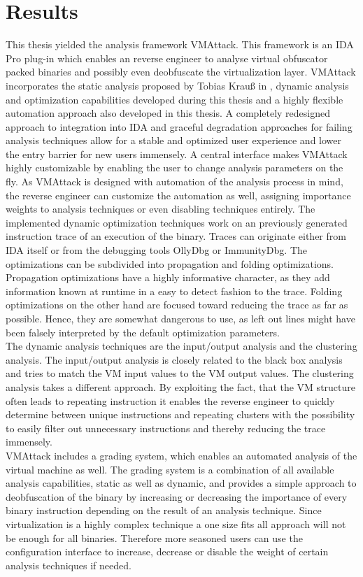 \documentclass[10pt,twoside,a4paper,bibliography=totoc]{scrbook}
\newcommand{\echoOther}[1]{Tobias Krau{\ss}}
\begin{document}
\section{Results}
\label{sec1:result}
This thesis yielded the analysis framework VMAttack. This framework is an IDA Pro plug-in which enables an reverse engineer to analyse virtual obfuscator packed binaries and possibly even deobfuscate the virtualization layer. 
VMAttack incorporates the static analysis proposed by \echoOther{} in \cite{Krau:Thesis2016}, dynamic analysis and optimization capabilities developed during this thesis and a highly flexible automation approach also developed in this thesis. 
A completely redesigned approach to integration into IDA and graceful degradation approaches for failing analysis techniques allow for a stable and optimized user experience and lower the entry barrier for new users immensely. 
A central interface makes VMAttack highly customizable by enabling the user to change analysis parameters on the fly. As VMAttack is designed with automation of the analysis process in mind, the reverse engineer can customize the automation as well, assigning importance weights to analysis techniques or even disabling techniques entirely.
The implemented dynamic optimization techniques work on an previously generated instruction trace of an execution of the binary. Traces can originate either from IDA itself or from the debugging tools OllyDbg or ImmunityDbg. The optimizations can be subdivided into propagation and folding optimizations. 
Propagation optimizations have a highly informative character, as they add information known at runtime in a easy to detect fashion to the trace. 
Folding optimizations on the other hand are focused toward reducing the trace as far as possible. Hence, they are somewhat dangerous to use, as left out lines might have been falsely interpreted by the default optimization parameters.\\
The dynamic analysis techniques are the input/output analysis and the clustering analysis. The input/output analysis is closely related to the black box analysis and tries to match the VM input values to the VM output values.
The clustering analysis takes a different approach. By exploiting the fact, that the VM structure often leads to repeating instruction it enables the reverse engineer to quickly determine between unique instructions and repeating clusters with the possibility to easily filter out unnecessary instructions and thereby reducing the trace immensely.\\
VMAttack includes a grading system, which enables an automated analysis of the virtual machine as well. The grading system is a combination of all available analysis capabilities, static as well as dynamic, and provides a simple approach to deobfuscation of the binary by increasing or decreasing the importance of every binary instruction depending on the result of an analysis technique. Since virtualization is a highly complex technique a one size fits all approach will not be enough for all binaries. Therefore more seasoned users can use the configuration interface to increase, decrease or disable the weight of certain analysis techniques if needed. 
\end{document}
